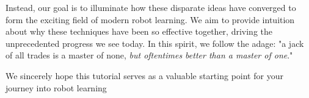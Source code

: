 Instead, our goal is to illuminate how these disparate ideas have converged to form the exciting field of modern robot learning. We aim to provide intuition about why these techniques have been so effective together, driving the unprecedented progress we see today. In this spirit, we follow the adage: "a jack of all trades is a master of none, \emph{but oftentimes better than a master of one}."

We sincerely hope this tutorial serves as a valuable starting point for your journey into robot learning